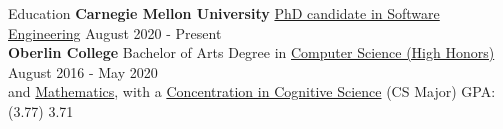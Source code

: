 \documentclass{resume}
\begin{document}
\begin{rSection}{Education}
{\bf Carnegie Mellon University}{ \href{https://se-phd.isri.cmu.edu/People/students/index.html}{PhD candidate in Software Engineering}} \hfill { August 2020 - Present} \\ 
{\bf Oberlin College} {Bachelor of Arts Degree in \href{https://www.cs.oberlin.edu/}{Computer Science (High Honors)}} \hfill { August 2016 - May 2020} \\
and \href{https://www.oberlin.edu/arts-and-sciences/departments/mathematics}{Mathematics}, with a \href{https://www.oberlin.edu/cognitive-sciences}{Concentration in Cognitive Science} \hfill {(CS Major) GPA: (3.77) 3.71} 
\end{rSection}
\end{document}
